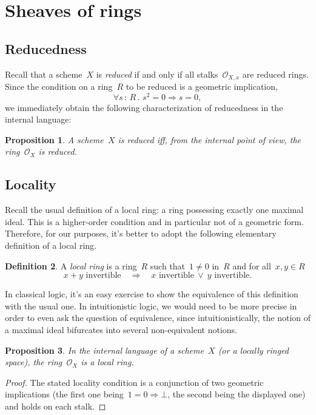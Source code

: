 \documentclass[10pt]{amsart}
\theoremstyle{definition}
\newtheorem{defn}{Definition}[section]
\theoremstyle{plain}
\newtheorem{prop}[defn]{Proposition}
\theoremstyle{remark}
\renewcommand{\O}{\mathcal{O}}
\newcommand{\?}{\,{:}\,}
\renewcommand{\_}{\mathpunct{.}\,}
\begin{document}
\section{Sheaves of rings}

\subsection{Reducedness} Recall that a scheme~$X$ is \emph{reduced} if and only
if all stalks~$\O_{X,x}$ are reduced rings. Since the condition on a ring~$R$
to be reduced is a geometric implication,
\[ \forall s\?R\_ s^2 = 0 \Longrightarrow s = 0, \]
we immediately obtain the following characterization of reducedness in the
internal language:
\begin{prop}A scheme~$X$ is reduced iff, from the internal point of view, the
ring~$\O_X$ is reduced.\end{prop}


\subsection{Locality} Recall the usual definition of a local ring: a ring
possessing exactly one maximal ideal. This is a higher-order condition and in
particular not of a geometric form. Therefore, for our purposes, it's better to
adopt the following elementary definition of a local ring.
\begin{defn}A \emph{local ring} is a ring~$R$ such that~$1 \neq 0$ in~$R$ and
for all~$x,y \in R$
\[ \text{$x+y$ invertible} \quad\Longrightarrow\quad
  \text{$x$ invertible}\ \vee\ \text{$y$ invertible}. \]
\end{defn}
In classical logic, it's an easy exercise to show the equivalence of this
definition with the usual one. In intuitionistic logic, we would need to be
more precise in order to even ask the question of equivalence, since
intuitionistically, the notion of a maximal ideal bifurcates into several non-equivalent notions.

\begin{prop}In the internal language of a scheme~$X$ (or a locally ringed
space), the ring~$\O_X$ is a local ring.\end{prop}
\begin{proof}The stated locality condition is a conjunction of two geometric
implications (the first one being~$1 = 0 \Rightarrow \bot$, the second being
the displayed one) and holds on each stalk.\end{proof}
\end{document}
